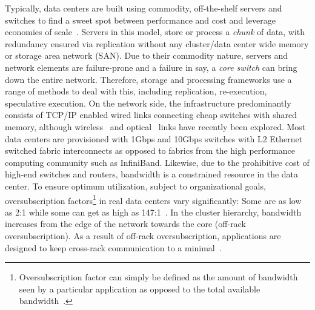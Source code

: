 \documentclass[a4paper,12pt,twoside,openright]{report}
\begin{document}
Typically, data centers are built using commodity, off-the-shelf servers and
switches to find a sweet spot between performance and cost and leverage
economies of scale~\cite{Barroso:2003:WSP}. Servers in this model, store or
process a \emph{chunk} of data, with redundancy ensured via replication without
any cluster/data center wide memory or storage area network (SAN). Due to their
commodity nature, servers and network elements are failure-prone and a failure
in say, a \emph{core switch} can bring down the entire network. Therefore,
storage and processing frameworks use a range of methods to deal with this,
including replication, re-execution, speculative execution. On the network side,
the infrastructure predominantly consists of TCP/IP enabled wired links
connecting cheap switches with shared memory, although
wireless~\cite{Halperin:2011:ADC} and
optical~\cite{Wang:2010:CPO,Farrington:2010:HHE} links have recently been
explored. Most data centers are provisioned with 1Gbps and 10Gbps switches with
L2 Ethernet switched fabric interconnects as opposed to fabrics from the high
performance computing community such as InfiniBand. Likewise, due to the
prohibitive cost of high-end switches and routers, bandwidth is a constrained
resource in the data center. To ensure optimum utilization, subject to
organizational goals, oversubscription factors\footnote{Oversubscription factor
can simply be defined as the amount of bandwidth seen by a particular
application as opposed to the total available
bandwidth~\cite{Al-Fares:2008:SCD}.} in real data centers vary significantly:
Some are as low as 2:1 while some can get as high as
147:1~\cite{Benson:2010:NTC}. In the cluster hierarchy, bandwidth increases from
the edge of the network towards the core (off-rack oversubscription). As a
result of off-rack oversubscription, applications are designed to keep
cross-rack communication to a minimal~\cite{Dean:2004:MSD}.
\end{document}
